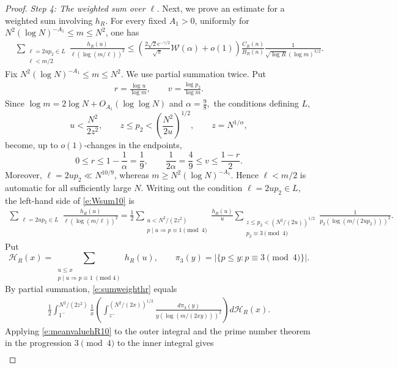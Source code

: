 \documentclass[12pt,reqno]{amsart}
\numberwithin{equation}{section}
\theoremstyle{definition}
\theoremstyle{remark}
\begin{document}
\begin{proof}
\emph{Step 4: The weighted sum over \(\ell\).}
Next, we prove an estimate for a weighted sum involving $h_R$. 
For every fixed \(A_1>0\), uniformly for
\(N^2(\log N)^{-A_1}\leq m\leq N^2\), one has
\begin{align}\label{e:Wsum10}
 &\sum_{\substack{\ell=2up_2\in L\\ \ell<m/2}}
 \frac{h_R(u)}{\ell(\log(m/\ell))^2}\leq
 \left(\frac{2\sqrt2e^{-\gamma/2}}{\sqrt\pi}
 \mathcal W(\alpha)+o(1)\right)
 \frac{C_R(n)}{B_R(n)}
 \frac1{\sqrt{\log R}(\log m)^{3/2}}.
\end{align}
Fix $N^2(\log N)^{-A_1}\leq m\leq N^2.$
We use partial summation twice.  Put
\begin{align}\label{e:rvdef}
     r=\frac{\log u}{\log m},
 \qquad
 v=\frac{\log p_2}{\log m}.
\end{align}
Since $\log m=2\log N+O_{A_1}(\log\log N)$ and $\alpha=\frac98,$
the conditions defining \(L\),
\[
 u<\frac{N^2}{2z^2},\qquad
 z\leq p_2<\left(\frac{N^2}{2u}\right)^{1/2},
 \qquad z=N^{1/\alpha},
\]
become, up to \(o(1)\)-changes in the endpoints,
\[
 0\leq r\leq1-\frac1\alpha=\frac19,
 \qquad
 \frac1{2\alpha}=\frac49
 \leq v\leq\frac{1-r}{2}.
\]
Moreover, \(\ell=2up_2\ll N^{10/9}\), whereas
\(m\geq N^2(\log N)^{-A_1}\).  Hence \(\ell<m/2\) is automatic for all
sufficiently large \(N\).
Writing out the condition \(\ell=2up_2\in L\), the left-hand side of
\eqref{e:Wsum10} is
\begin{align}\label{e:sumweighthr}
     \sum_{\substack{\ell=2up_2\in L}}
 \frac{h_R(u)}{\ell(\log(m/\ell))^2}
 =
 \frac12
 \sum_{\substack{u<N^2/(2z^2)\\ p\mid u\Rightarrow p\equiv1\pmod4}}
 \frac{h_R(u)}u
 \sum_{\substack{z\leq p_2<(N^2/(2u))^{1/2}\\ p_2\equiv3\pmod4}}
 \frac1{p_2(\log(m/(2up_2)))^2}. \qquad 
\end{align}
Put
\[
 \mathcal H_R(x)=
 \sum_{\substack{u\leq x\\p\mid u\Rightarrow p\equiv1\;(\mathrm{mod}\;4)}}
 h_R(u),
 \qquad
 \pi_3(y)=|\{p\leq y:p\equiv3\pmod4\}|.
\]
By partial summation, \eqref{e:sumweighthr} equals
\begin{align*}
 \frac12\int_{1^-}^{N^2/(2z^2)}\frac1x
 \left(
 \int_{z^-}^{(N^2/(2x))^{1/2}}
 \frac{d\pi_3(y)}
 {y(\log(m/(2xy)))^2}
 \right)d\mathcal H_R(x).
\end{align*}
Applying \eqref{e:meanvaluehR10} to the outer integral and the prime
number theorem in the progression \(3\pmod4\) to the inner integral
gives
\begin{align*}

\end{align*}
\end{proof}
\end{document}
